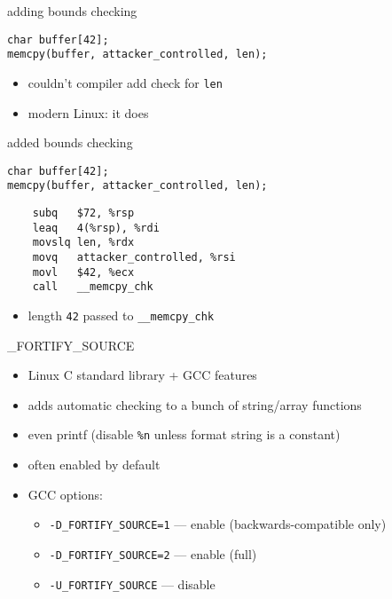 \begin{frame}[fragile,label=fortifyMemCpyIntro]{adding bounds checking}
\lstset{language=C,style=small}
\begin{lstlisting}
char buffer[42];
memcpy(buffer, attacker_controlled, len);
\end{lstlisting}
    \begin{itemize}
        \item couldn't compiler add check for \texttt{len}
        \item modern Linux: it does
    \end{itemize}
\end{frame}

\begin{frame}[fragile,label=boundsChecking]{added bounds checking}
\lstset{language=C,style=small}
\begin{lstlisting}
char buffer[42];
memcpy(buffer, attacker_controlled, len);
\end{lstlisting}
\lstset{language=myasm,style=small}
\begin{lstlisting}
    subq   $72, %rsp
    leaq   4(%rsp), %rdi
    movslq len, %rdx
    movq   attacker_controlled, %rsi
    movl   $42, %ecx
    call   __memcpy_chk
\end{lstlisting}
    \begin{itemize}
        \item length \texttt{42} passed to \texttt{\_\_memcpy\_chk}
    \end{itemize}
\end{frame}

\begin{frame}{\_FORTIFY\_SOURCE}
    \begin{itemize}
        \item Linux C standard library + GCC features
        \item adds automatic checking to a bunch of string/array functions
        \item even printf (disable \texttt{\%n} unless format string is a constant)
        \vspace{.5cm}
        \item often enabled by default
        \item GCC options:
            \begin{itemize}
                \item \texttt{-D\_FORTIFY\_SOURCE=1} --- enable (backwards-compatible only)
                \item \texttt{-D\_FORTIFY\_SOURCE=2} --- enable (full)
                \item \texttt{-U\_FORTIFY\_SOURCE} --- disable
            \end{itemize}
    \end{itemize}
\end{frame}

